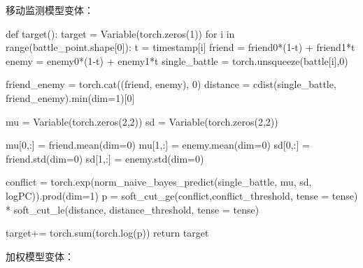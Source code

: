 \documentclass{article}
\begin{document}
移动监测模型变体：

\begin{python}
def target():
    target = Variable(torch.zeros(1))
    for i in range(battle_point.shape[0]):
        t = timestamp[i]
        friend = friend0*(1-t) + friend1*t
        enemy = enemy0*(1-t) + enemy1*t
        single_battle = torch.unsqueeze(battle[i],0) 
        
        friend_enemy = torch.cat((friend, enemy), 0)
        distance = cdist(single_battle, friend_enemy).min(dim=1)[0]
        
        mu = Variable(torch.zeros(2,2)) 
        sd = Variable(torch.zeros(2,2))

        mu[0,:] = friend.mean(dim=0)
        mu[1,:] = enemy.mean(dim=0)
        sd[0,:] = friend.std(dim=0)
        sd[1,:] = enemy.std(dim=0)

        conflict = torch.exp(norm_naive_bayes_predict(single_battle, mu, sd, logPC)).prod(dim=1)
        p = soft_cut_ge(conflict,conflict_threshold, tense = tense) * soft_cut_le(distance, distance_threshold, tense = tense)

        target+= torch.sum(torch.log(p))
    return target

\end{python}


加权模型变体：
\end{document}
